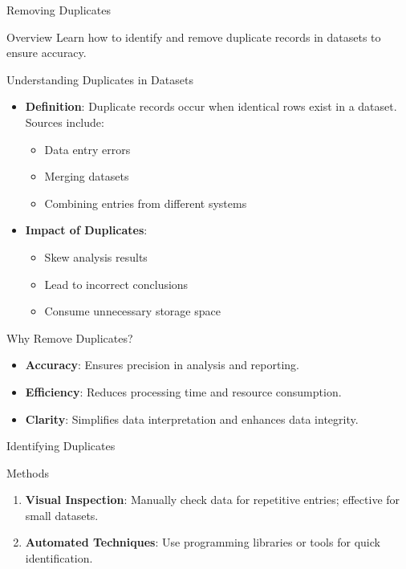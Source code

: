 \documentclass[aspectratio=169]{beamer}
\begin{document}
\begin{frame}[fragile]{Removing Duplicates}
  \begin{block}{Overview}
    Learn how to identify and remove duplicate records in datasets to ensure accuracy.
  \end{block}
\end{frame}

\begin{frame}[fragile]{Understanding Duplicates in Datasets}
  \begin{itemize}
    \item \textbf{Definition}: Duplicate records occur when identical rows exist in a dataset. Sources include:
      \begin{itemize}
        \item Data entry errors
        \item Merging datasets
        \item Combining entries from different systems
      \end{itemize}
    \item \textbf{Impact of Duplicates}:
      \begin{itemize}
        \item Skew analysis results
        \item Lead to incorrect conclusions
        \item Consume unnecessary storage space
      \end{itemize}
  \end{itemize}
\end{frame}

\begin{frame}[fragile]{Why Remove Duplicates?}
  \begin{itemize}
    \item \textbf{Accuracy}: Ensures precision in analysis and reporting.
    \item \textbf{Efficiency}: Reduces processing time and resource consumption.
    \item \textbf{Clarity}: Simplifies data interpretation and enhances data integrity.
  \end{itemize}
\end{frame}

\begin{frame}[fragile]{Identifying Duplicates}
  \begin{block}{Methods}
    \begin{enumerate}
      \item \textbf{Visual Inspection}: Manually check data for repetitive entries; effective for small datasets.
      \item \textbf{Automated Techniques}: Use programming libraries or tools for quick identification.
    \end{enumerate}
  \end{block}
\end{frame}
\end{document}
